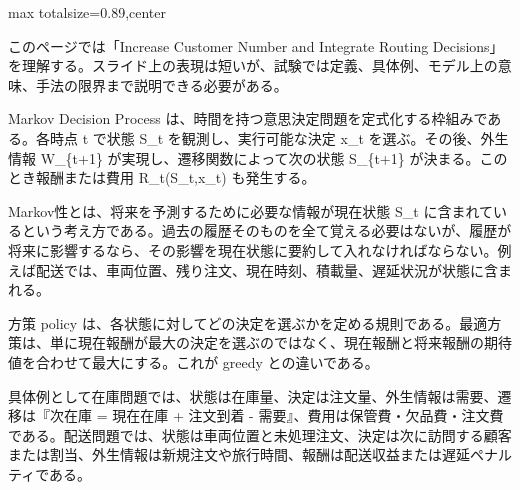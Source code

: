 \begin{minipage}[t]{0.58\textwidth}
\begin{adjustbox}{max totalsize={\textwidth}{0.89\textheight},center}
\begin{minipage}{\textwidth}\scriptsize
{}このページでは「Increase Customer Number and Integrate Routing Decisions」を理解する。スライド上の表現は短いが、試験では定義、具体例、モデル上の意味、手法の限界まで説明できる必要がある。\par
Markov Decision Process は、時間を持つ意思決定問題を定式化する枠組みである。各時点 t で状態 S\_t を観測し、実行可能な決定 x\_t を選ぶ。その後、外生情報 W\_\{t+1\} が実現し、遷移関数によって次の状態 S\_\{t+1\} が決まる。このとき報酬または費用 R\_t(S\_t,x\_t) も発生する。\par
Markov性とは、将来を予測するために必要な情報が現在状態 S\_t に含まれているという考え方である。過去の履歴そのものを全て覚える必要はないが、履歴が将来に影響するなら、その影響を現在状態に要約して入れなければならない。例えば配送では、車両位置、残り注文、現在時刻、積載量、遅延状況が状態に含まれる。\par
方策 policy は、各状態に対してどの決定を選ぶかを定める規則である。最適方策は、単に現在報酬が最大の決定を選ぶのではなく、現在報酬と将来報酬の期待値を合わせて最大にする。これが greedy との違いである。\par
具体例として在庫問題では、状態は在庫量、決定は注文量、外生情報は需要、遷移は『次在庫 = 現在在庫 + 注文到着 - 需要』、費用は保管費・欠品費・注文費である。配送問題では、状態は車両位置と未処理注文、決定は次に訪問する顧客または割当、外生情報は新規注文や旅行時間、報酬は配送収益または遅延ペナルティである。\par

\end{minipage}
\end{adjustbox}
\end{minipage}
